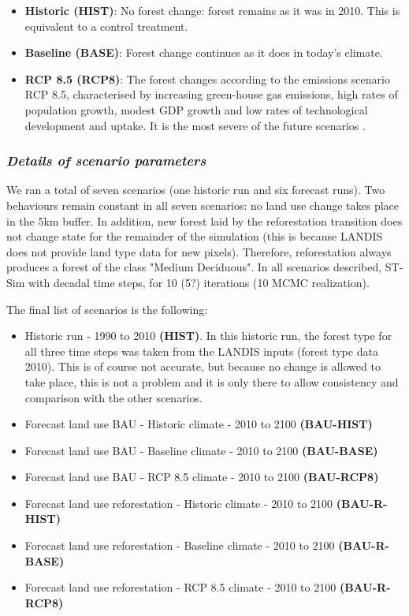 \begin{itemize}
\item{\textbf{Historic (HIST)}}: No forest change: forest remains as it was in 2010. This is equivalent to a control treatment.
\item{\textbf{Baseline (BASE)}}: Forest change continues as it does in today's climate.
\item{\textbf{RCP 8.5 (RCP8)}}: The forest changes according to the emissions scenario RCP 8.5, characterised by increasing green-house gas emissions, high rates of population growth, modest GDP growth and low rates of technological development and uptake. It is the most severe of the future scenarios \citep{ipcc_summary_2013}.\\
\end{itemize}

\subsubsection*{\textit{Details of scenario parameters}}

We ran a total of seven scenarios (one historic run and six forecast runs). Two behaviours remain constant in all seven scenarios: no land use change  takes place in the 5km buffer. In addition, new forest laid by the reforestation transition does not change state for the remainder of the simulation (this is because LANDIS does not provide land type data for new pixels). Therefore, reforestation always produces a forest of the class "Medium Deciduous". In all scenarios described, ST-Sim with decadal time steps, for 10 (5?) iterations (10 MCMC realization).

The final list of scenarios is the following:
\begin{itemize}
\item Historic run - 1990 to 2010 \textbf{(HIST)}. In this historic run, the forest type for all three time steps was taken from the LANDIS inputs (forest type data 2010). This is of course not accurate, but because no change is allowed to take place, this is not a problem and it is only there to allow consistency and comparison with the other scenarios.
\item Forecast land use BAU - Historic climate - 2010 to 2100 \textbf{(BAU-HIST)}
\item Forecast land use BAU - Baseline climate - 2010 to 2100 \textbf{(BAU-BASE)}
\item Forecast land use BAU - RCP 8.5 climate - 2010 to 2100 \textbf{(BAU-RCP8)}
\item Forecast land use reforestation - Historic climate - 2010 to 2100 \textbf{(BAU-R-HIST)}
\item Forecast land use reforestation - Baseline climate - 2010 to 2100 \textbf{(BAU-R-BASE)}
\item Forecast land use reforestation - RCP 8.5 climate - 2010 to 2100 \textbf{(BAU-R-RCP8)}\\
\end{itemize}

